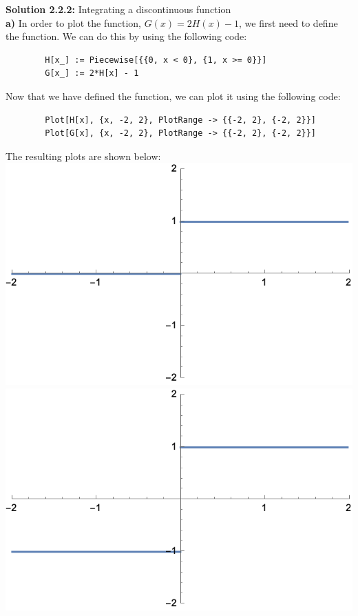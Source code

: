 \documentclass{article}
\begin{document}
    \textbf{Solution 2.2.2:} Integrating a discontinuous function \\ 
    \textbf{a)} In order to plot the function, $G(x)= 2H(x)-1$, we first need to define the function. We can do this by using the following code: \\
    \begin{verbatim}
        H[x_] := Piecewise[{{0, x < 0}, {1, x >= 0}}]
        G[x_] := 2*H[x] - 1
    \end{verbatim}
    Now that we have defined the function, we can plot it using the following code: \\
    \begin{verbatim}
        Plot[H[x], {x, -2, 2}, PlotRange -> {{-2, 2}, {-2, 2}}]
        Plot[G[x], {x, -2, 2}, PlotRange -> {{-2, 2}, {-2, 2}}]
    \end{verbatim}
    The resulting plots are shown below: \\
    \includegraphics[scale=0.5]{2.2.2a.png} \\
    \includegraphics[scale=0.5]{2.2.2a2.png} \\
\end{document}
